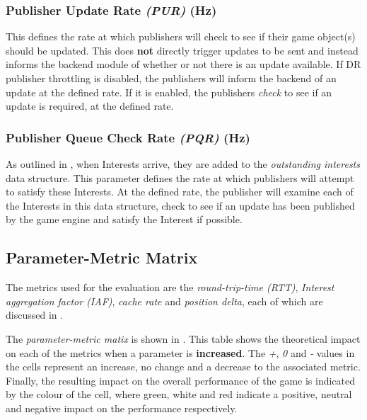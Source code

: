 \subsubsection*{Publisher Update Rate \textit{(PUR)} (Hz)}
This defines the rate at which publishers will check to see if their game object(s) should be updated. This does \textbf{not} directly trigger updates to be sent and instead informs the backend module of whether or not there is an update available. If DR publisher throttling is disabled, the publishers will inform the backend of an update at the defined rate. If it is enabled, the publishers \textit{check} to see if an update is required, at the defined rate. 

\subsubsection*{Publisher Queue Check Rate \textit{(PQR)} (Hz)}
As outlined in , when Interests arrive, they are added to the \textit{outstanding interests} data structure. This parameter defines the rate at which publishers will attempt to satisfy these Interests. At the defined rate, the publisher will examine each of the Interests in this data structure, check to see if an update has been published by the game engine and satisfy the Interest if possible. 

\subsection{Parameter-Metric Matrix}
The metrics used for the evaluation are the \textit{round-trip-time (RTT)}, \textit{Interest aggregation factor (IAF)}, \textit{cache rate} and \textit{position delta}, each of which are discussed in .

The \textit{parameter-metric matix} is shown in . This table shows the theoretical impact on each of the metrics when a parameter is \textbf{increased}. The \textit{+}, \textit{0} and \textit{-} values in the cells represent an increase, no change and a decrease to the associated metric. Finally, the resulting impact on the overall performance of the game is indicated by the colour of the cell, where green, white and red indicate a positive, neutral and negative impact on the performance respectively. 

